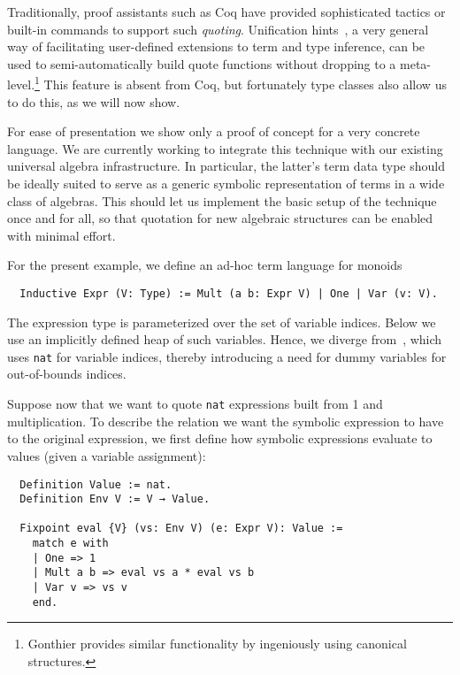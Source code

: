 \documentclass[a4paper,10pt,runningheads]{llncs}
\begin{document}
Traditionally, proof assistants such as Coq have provided sophisticated tactics or built-in commands to support such \emph{quoting}. Unification hints~\cite{Hints}, a very general way of facilitating user-defined extensions to term and type inference, can be used to semi-automatically build quote functions without dropping to a meta-level.\footnote{Gonthier provides similar functionality by ingeniously using canonical structures.} This feature is absent from Coq, but fortunately type classes also allow us to do this, as we will now show.

For ease of presentation we show only a proof of concept for a very concrete language. We are currently working to integrate this technique with our existing universal algebra infrastructure. In particular, the latter's term data type should be ideally suited to serve as a generic symbolic representation of terms in a wide class of algebras. This should let us implement the basic setup of the technique once and for all, so that quotation for new algebraic structures can be enabled with minimal effort.

For the present example, we define an ad-hoc term language for monoids
\begin{lstlisting}
  Inductive Expr (V: Type) := Mult (a b: Expr V) | One | Var (v: V).
\end{lstlisting}
The expression type is parameterized over the set of variable indices. Below we use an implicitly defined heap of such variables. Hence, we diverge from~\cite{Hints}, which uses \lstinline|nat| for variable indices, thereby introducing a need for dummy variables for out-of-bounds indices.

Suppose now that we want to quote \lstinline|nat| expressions built from 1 and multiplication. To describe the relation we want the symbolic expression to have to the original expression, we first define how symbolic expressions evaluate to values (given a variable assignment):
\begin{lstlisting}
  Definition Value := nat.
  Definition Env V := V → Value.

  Fixpoint eval {V} (vs: Env V) (e: Expr V): Value :=
    match e with
    | One => 1
    | Mult a b => eval vs a * eval vs b
    | Var v => vs v
    end.
\end{lstlisting}
\end{document}
